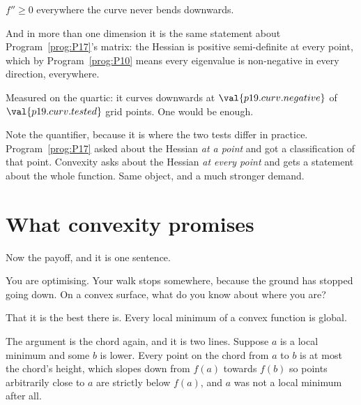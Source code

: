 \begin{fr}
\begin{ansblock}
$f'' \ge 0$ everywhere \dash{} the curve never bends downwards.
\end{ansblock}

And in more than one dimension it is the same statement about
Program~\ref{prog:P17}'s matrix: the Hessian is positive semi-definite at
every point, which by Program~\ref{prog:P10} means every eigenvalue is
non-negative in every direction, everywhere.

Measured on the quartic: it curves downwards at $\val{p19.curv.negative}$ of
$\val{p19.curv.tested}$ grid points. One would be enough.

\begin{note}
Note the quantifier, because it is where the two tests differ in practice.
Program~\ref{prog:P17} asked about the Hessian \emph{at a point} and got a
classification of that point. Convexity asks about the Hessian \emph{at every
point} and gets a statement about the whole function. Same object, and a
much stronger demand.
\end{note}
\end{fr}

\section{What convexity promises}
\label{sec:P19-promise}

\begin{fr}
Now the payoff, and it is one sentence.

You are optimising. Your walk stops somewhere, because the ground has stopped
going down. On a convex surface, what do you know about where you are?
\nextframe
\end{fr}

\begin{fr}
\begin{ansblock}
That it is the best there is. Every local minimum of a convex function is
global.
\end{ansblock}

The argument is the chord again, and it is two lines. Suppose $a$ is a local
minimum and some $b$ is lower. Every point on the chord from $a$ to $b$ is at
most the chord's height, which slopes down from $f(a)$ towards $f(b)$ \dash{}
so points arbitrarily close to $a$ are strictly below $f(a)$, and $a$ was not
a local minimum after all.

\end{fr}

